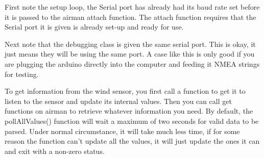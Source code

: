 \documentclass[letterpaper]{article}
\begin{document}
First note the setup loop, the Serial port has already had its baud rate set before it is passed to the airman attach function. The attach function requires that the Serial port it is given is already set-up and ready for use.

Next note that the debugging class is given the same serial port. This is okay, it just means they will be using the same port. A case like this is only good if you are plugging the arduino directly into the computer and feeding it NMEA strings for testing. 

To get information from the wind sensor, you first call a  function to get it to listen to the sensor and update its internal values. Then you can call get functions on airman to retrieve whatever information you need. By default, the pollAllValues() function will wait a maximum of two seconds for valid data to be parsed. Under normal circumstance, it will take much less time, if for some reason the function can't update all the values, it will just update the ones it can and exit with a non-zero status.

\end{document}
